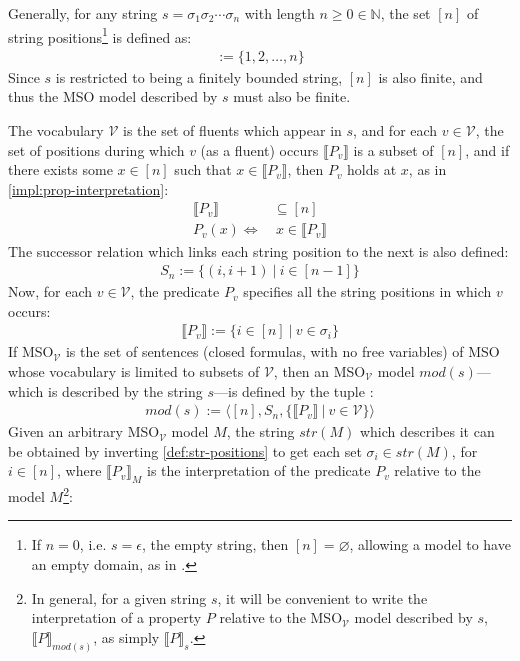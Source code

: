 \documentclass[a4paper,12pt,leqno]{article}
\renewcommand{\emptyset}{\varnothing}
\begin{document}
Generally, for any string $s = \sigma_1\sigma_2\cdots\sigma_n$ with length $n \ge 0 \in \mathbb{N}$, the set $[n]$ of string positions\footnote{If $n = 0$, i.e. $s = \epsilon$, the empty string, then $[n] = \emptyset$, allowing a model to have an empty domain, as in \citet{Libkin2004}.} is defined as:
\begin{align}
	[n] := \{1,2,\ldots,n\}
\end{align}
Since $s$ is restricted to being a finitely bounded string, $[n]$ is also finite, and thus the MSO model described by $s$ must also be finite.

The vocabulary $\mathcal{V}$ is the set of fluents which appear in $s$, and for each $v \in \mathcal{V}$, the set of positions during which $v$ (as a fluent) occurs $\llbracket P_v \rrbracket$ is a subset of $[n]$, and if there exists some $x \in [n]$ such that $x \in \llbracket P_v \rrbracket$, then $P_v$ holds at $x$, as in \cref{impl:prop-interpretation}:
\begin{align}
	\llbracket P_v \rrbracket &\subseteq [n]\\
	P_v(x) \Longleftrightarrow& ~x \in \llbracket P_v \rrbracket
\end{align}
The successor relation which links each string position to the next is also defined:
\begin{align}
	S_n := \{(i, i+1) ~|~ i \in [n - 1]\}
\end{align}
Now, for each $v \in \mathcal{V}$, the predicate $P_v$ specifies all the string positions in which $v$ occurs:
\begin{align}\label{def:str-positions}
	\llbracket P_v \rrbracket := \{i \in [n] ~|~ v \in \sigma_i\}
\end{align}
If MSO$_{\mathcal{V}}$ is the set of sentences (closed formulas, with no free variables) of MSO whose vocabulary is limited to subsets of $\mathcal{V}$, then an MSO$_{\mathcal{V}}$ model $mod(s)$---which is described by the string $s$---is defined by the tuple \citep{fernando2016regular}:
\begin{align}
	mod(s) := \langle [n], S_n, \{\llbracket P_v \rrbracket ~|~ v \in \mathcal{V}\} \rangle
\end{align}
Given an arbitrary MSO$_{\mathcal{V}}$ model $M$, the string $str(M)$ which describes it can be obtained by inverting \cref{def:str-positions} to get each set $\sigma_i \in str(M)$, for $i \in [n]$, where $\llbracket P_v \rrbracket_M$ is the interpretation of the predicate $P_v$ relative to the model $M$\footnote{In general, for a given string $s$, it will be convenient to write the interpretation of a property $P$ relative to the MSO$_{\mathcal{V}}$ model described by $s$, $\llbracket P \rrbracket_{mod(s)}$, as simply $\llbracket P \rrbracket_s$.}:
\end{document}
